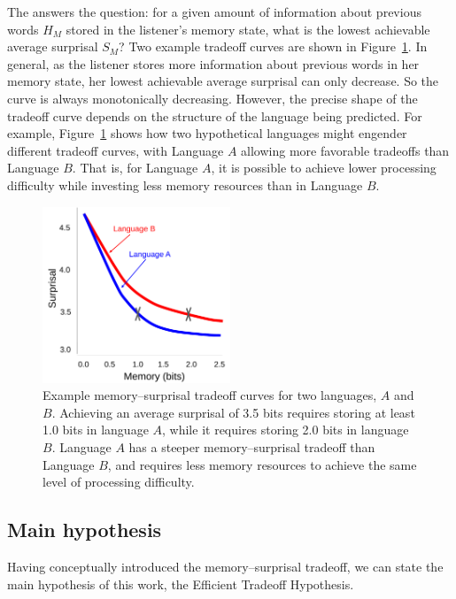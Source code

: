 The  answers the question: 
for a given amount of information about previous words $H_M$ stored in the listener's memory state, what is the lowest achievable average surprisal $S_M$? Two example tradeoff curves are shown in Figure~\ref{fig:examples}. In general, as the listener stores more information about previous words in her memory state, her lowest achievable average surprisal can only decrease. So the curve is always monotonically decreasing. However, the precise shape of the tradeoff curve depends on the structure of the language being predicted. For example, Figure~\ref{fig:examples} shows how two hypothetical languages might engender different tradeoff curves, with Language $A$ allowing more favorable tradeoffs than Language $B$. That is, for Language $A$, it is possible to achieve lower processing difficulty while investing less memory resources than in Language $B$.

\begin{figure}
\centering
\includegraphics[width=0.5\textwidth]{figures-gdrive/tradeoff-schematic.pdf}
\caption{Example memory--surprisal tradeoff curves for two languages, $A$ and $B$. Achieving an average surprisal of 3.5 bits requires storing at least 1.0 bits in language $A$, while it requires storing 2.0 bits in language $B$. Language $A$ has a steeper memory--surprisal tradeoff than Language $B$, and requires less memory resources to achieve the same level of processing difficulty.}
\label{fig:examples}
\end{figure}

\subsection{Main hypothesis}

Having conceptually introduced the memory--surprisal tradeoff, we can state the main hypothesis of this work, the Efficient Tradeoff Hypothesis.

